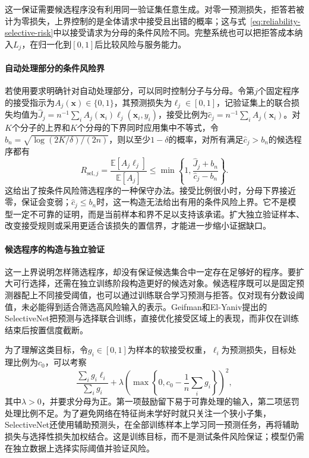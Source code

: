 这一保证需要候选程序没有利用同一验证集任意生成。对零一预测损失，拒答若被计为零损失，上界控制的是全体请求中接受且出错的概率；这与式~\eqref{eq:reliability-selective-risk}中以接受请求为分母的条件风险不同。完整系统也可以把拒答成本纳入$L_j$，在归一化到$[0,1]$后比较风险与服务能力。

\paragraph{自动处理部分的条件风险界}

若使用要求明确针对自动处理部分，可以同时控制分子与分母。令第$j$个固定程序的接受指示为$A_j(\bm{x})\in\{0,1\}$，其预测损失为$\ell_j\in[0,1]$，记验证集上的联合损失均值为$\hat J_j=n^{-1}\sum_i A_j(\bm{x}_i)\ell_j(\bm{x}_i,y_i)$，接受比例为$\hat c_j=n^{-1}\sum_i A_j(\bm{x}_i)$。对$K$个分子的上界和$K$个分母的下界同时应用集中不等式，令$b_n=\sqrt{\log(2K/\delta)/(2n)}$，则以至少$1-\delta$的概率，对所有满足$\hat c_j>b_n$的候选程序都有
\begin{equation}
 R_{\mathrm{sel},j}
 =\frac{\mathbb E[A_j\ell_j]}{\mathbb E[A_j]}
 \leq\min\left\{1,\frac{\hat J_j+b_n}{\hat c_j-b_n}\right\}.
 \label{eq:reliability-conditional-risk-bound}
\end{equation}
这给出了按条件风险筛选程序的一种保守办法。接受比例很小时，分母下界接近零，保证会变弱；$\hat c_j\leq b_n$时，这一构造无法给出有用的条件风险上界。它不是模型一定不可靠的证明，而是当前样本和界不足以支持该承诺。扩大独立验证样本、改变接受规则或采用更适合该损失的置信界，才能进一步缩小证据缺口。

\paragraph{候选程序的构造与独立验证}

这一上界说明怎样筛选程序，却没有保证候选集合中一定存在足够好的程序。要扩大可行选择，还需在独立训练阶段构造更好的候选对象。候选程序既可以是固定预测器配上不同接受阈值，也可以通过训练联合学习预测与拒答。仅对现有分数设阈值，未必能得到适合筛选高风险输入的表示。Geifman和El-Yaniv提出的SelectiveNet把预测与选择联合训练，直接优化接受区域上的表现，而非仅在训练结束后按置信度截断。

为了理解这类目标，令$g_i\in[0,1]$为样本的软接受权重，$\ell_i$为预测损失，目标处理比例为$c_0$，可以考察
\begin{equation}
 \frac{\sum_i g_i\ell_i}{\sum_i g_i}
 +\lambda\left(\max\left\{0,c_0-\frac1n\sum_i g_i\right\}\right)^2,
 \label{eq:reliability-selective-training}
\end{equation}
其中$\lambda>0$，并要求分母为正。第一项鼓励留下易于可靠处理的输入，第二项惩罚处理比例不足。为了避免网络在特征尚未学好时就只关注一个狭小子集，SelectiveNet还使用辅助预测头，在全部训练样本上学习同一预测任务，再将辅助损失与选择性损失加权结合。这是训练目标，而不是测试条件风险保证；模型仍需在独立数据上选择实际阈值并验证风险。

